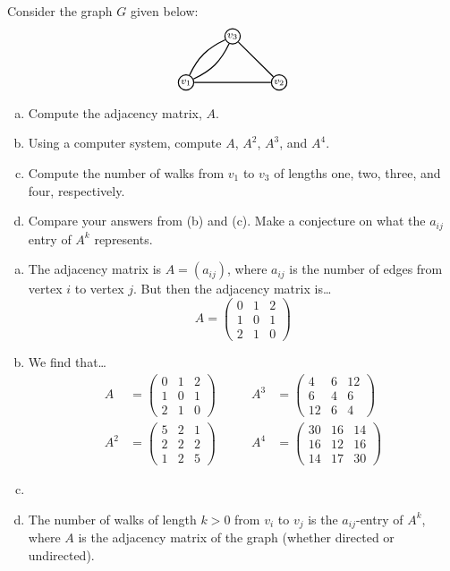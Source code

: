 \documentclass[11pt,letterpaper]{article}
\begin{document}
\newpage



 Consider the graph $G$ given below: 
	\[
	\graphSeven
	\] 

\begin{enumerate}[(a)]
\item Compute the adjacency matrix, $A$.
\item Using a computer system, compute $A$, $A^2$, $A^3$, and $A^4$. 
\item Compute the number of walks from $v_1$ to $v_3$ of lengths one, two, three, and four, respectively. 
\item Compare your answers from (b) and (c). Make a conjecture on what the $a_{ij}$ entry of $A^k$ represents. 
\end{enumerate} \pspace

\sol
\begin{enumerate}[(a)]
\item The adjacency matrix is $A= (a_{ij})$, where $a_{ij}$ is the number of edges from vertex $i$ to vertex $j$. But then the adjacency matrix is\dots
	\[
	A= \begin{pmatrix}
	0 & 1 & 2 \\
	1 & 0 & 1 \\
	2 & 1 & 0
	\end{pmatrix}
	\] \pspace

\item We find that\dots
	\[
	\begin{aligned}
	A&= \begin{pmatrix} 0 & 1 & 2 \\ 1 & 0 & 1 \\ 2 & 1 & 0 \end{pmatrix} \qquad& A^3&= \begin{pmatrix} 4 & 6 & 12 \\ 6 & 4 & 6 \\ 12 & 6 & 4 \end{pmatrix} \\[0.3cm]
	A^2&= \begin{pmatrix} 5 & 2 & 1 \\ 2 & 2 & 2 \\ 1 & 2 & 5 \end{pmatrix} & A^4&= \begin{pmatrix} 30 & 16 & 14 \\ 16 & 12 & 16 \\ 14 & 17 & 30 \end{pmatrix}
	\end{aligned}
	\] \pspace

\item 














\item The number of walks of length $k > 0$ from $v_i$ to $v_j$ is the $a_{ij}$-entry of $A^k$, where $A$ is the adjacency matrix of the graph (whether directed or undirected). 
\end{enumerate}
\end{document}
